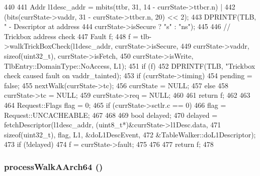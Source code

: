 \begin{DoxyCode}
{440 
441     Addr l1desc_addr = mbits(ttbr, 31, 14 - currState->ttbcr.n) |
442         (bits(currState->vaddr, 31 - currState->ttbcr.n, 20) << 2);
443     DPRINTF(TLB, " - Descriptor at address %
444             currState->isSecure ? "s" : "ns");
445 
446     // Trickbox address check
447     Fault f;
448     f = tlb->walkTrickBoxCheck(l1desc_addr, currState->isSecure,
449             currState->vaddr, sizeof(uint32_t), currState->isFetch,
450             currState->isWrite, TlbEntry::DomainType::NoAccess, L1);
451     if (f) {
452         DPRINTF(TLB, "Trickbox check caused fault on %
      vaddr_tainted);
453         if (currState->timing) {
454             pending = false;
455             nextWalk(currState->tc);
456             currState = NULL;
457         } else {
458             currState->tc = NULL;
459             currState->req = NULL;
460         }
461         return f;
462     }
463 
464     Request::Flags flag = 0;
465     if (currState->sctlr.c == 0) {
466         flag = Request::UNCACHEABLE;
467     }
468 
469     bool delayed;
470     delayed = fetchDescriptor(l1desc_addr, (uint8_t*)&currState->l1Desc.data,
471                               sizeof(uint32_t), flag, L1, &doL1DescEvent,
472                               &TableWalker::doL1Descriptor);
473     if (!delayed) {
474        f = currState->fault;
475     }
476 
477     return f;
478 }
\end{DoxyCode}
\hypertarget{classArmISA_1_1TableWalker_a8530d760b97c61b1bf18de8228c3aa90}{
\subsubsection[{processWalkAArch64}]{ processWalkAArch64 ()}}
\label{classArmISA_1_1TableWalker_a8530d760b97c61b1bf18de8228c3aa90}



